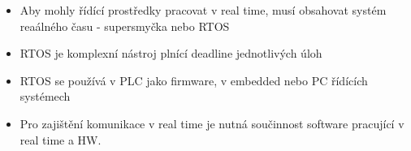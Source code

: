 \begin{itemize}
    \item Aby mohly řídící prostředky pracovat v real time, musí obsahovat systém reaálného času - supersmyčka nebo RTOS
    \item RTOS je komplexní nástroj plnící deadline jednotlivých úloh
    \item RTOS se používá v PLC jako firmware, v embedded nebo PC řídících systémech
    \item Pro zajištění komunikace v real time je nutná součinnost software pracující v real time a HW.
\end{itemize}


